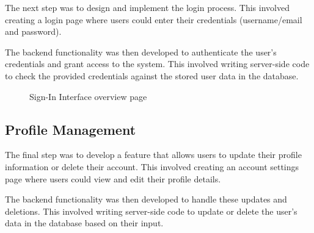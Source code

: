 The next step was to design and implement the login process. This involved creating a login page where users could enter their credentials (username/email and password).

The backend functionality was then developed to authenticate the user's credentials and grant access to the system. This involved writing server-side code to check the provided credentials against the stored user data in the database.

\begin{figure}[H]
    \centering
    \caption{ Sign-In Interface overview page}
    \label{fig:Sign-In-Interface-overview-page}
\end{figure}



\subsection{Profile Management}

The final step was to develop a feature that allows users to update their profile information or delete their account. This involved creating an account settings page where users could view and edit their profile details.

The backend functionality was then developed to handle these updates and deletions. This involved writing server-side code to update or delete the user's data in the database based on their input.


